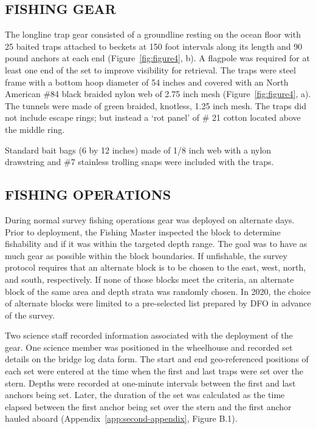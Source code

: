 \documentclass[12pt]{article}\usepackage[]{graphicx}\usepackage[]{color}
\begin{document}
\hypertarget{fishing-gear}{%
\subsection{FISHING GEAR}\label{fishing-gear}}

The longline trap gear consisted of a groundline resting on the ocean floor with 25 baited traps attached to beckets at 150 foot intervals along its length and 90 pound anchors at each end (Figure~\ref{fig:figure4}, b). A flagpole was required for at least one end of the set to improve visibility for retrieval. The traps were steel frame with a bottom hoop diameter of 54 inches and covered with an North American \#84 black braided nylon web of 2.75 inch mesh (Figure~\ref{fig:figure4}, a). The tunnels were made of green braided, knotless, 1.25 inch mesh. The traps did not include escape rings; but instead a `rot panel' of \# 21 cotton located above the middle ring.

Standard bait bags (6 by 12 inches) made of 1/8 inch web with a nylon drawstring and \#7 stainless trolling snaps were included with the traps.

\hypertarget{fishing-operations}{%
\subsection{FISHING OPERATIONS}\label{fishing-operations}}

During normal survey fishing operations gear was deployed on alternate days. Prior to deployment, the Fishing Master inspected the block to determine fishability and if it was within the targeted depth range. The goal was to have as much gear as possible within the block boundaries. If unfishable, the survey protocol requires that an alternate block is to be chosen to the east, west, north, and south, respectively. If none of those blocks meet the criteria, an alternate block of the same area and depth strata was randomly chosen. In 2020, the choice of alternate blocks were limited to a pre-selected list prepared by DFO in advance of the survey.

Two science staff recorded information associated with the deployment of the gear. One science member was positioned in the wheelhouse and recorded set details on the bridge log data form. The start and end geo-referenced positions of each set were entered at the time when the first and last traps were set over the stern. Depths were recorded at one-minute intervals between the first and last anchors being set. Later, the duration of the set was calculated as the time elapsed between the first anchor being set over the stern and the first anchor hauled aboard (Appendix~\ref{app:second-appendix}, Figure B.1).
\end{document}
